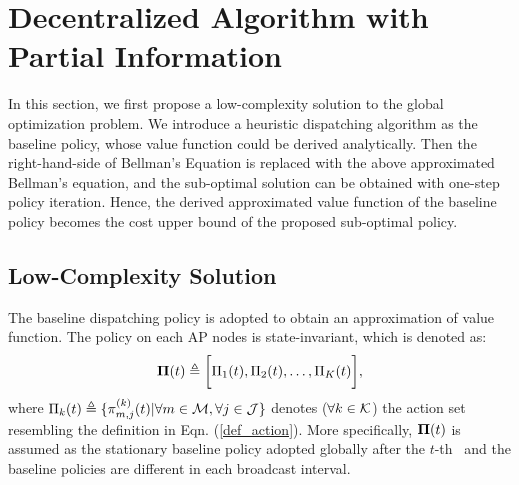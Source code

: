 \section{Decentralized Algorithm with Partial Information}
In this section, we first propose a low-complexity solution to the global optimization problem.
We introduce a heuristic dispatching algorithm as the baseline policy, whose value function could be derived analytically.
Then the right-hand-side of Bellman's Equation is replaced with the above approximated Bellman's equation, and the sub-optimal solution can be obtained with one-step policy iteration.
Hence, the derived approximated value function of the baseline policy becomes the cost upper bound of the proposed sub-optimal policy.



\subsection{Low-Complexity Solution}
The baseline dispatching policy is adopted to obtain an approximation of value function. The policy on each AP nodes is state-invariant, which is denoted as:
\begin{align}
    \boldsymbol{\Pi}(t) \triangleq \bigg[\Pi_1(t), \Pi_2(t), \dots, \Pi_K(t)\bigg],
\end{align}
where $\Pi_k(t) \triangleq \{\pi^{(k)}_{m,j}(t) | \forall m\in\mathcal{M},\forall j\in\mathcal{J}\}$ denotes ($\forall k\in\mathcal{K}$) the action set resembling the definition in Eqn. (\ref{def_action}).
More specifically, $\boldsymbol{\Pi}(t)$ is assumed as the stationary baseline policy adopted globally after the $t$-th \brpoint~and the baseline policies are different in each broadcast interval.

